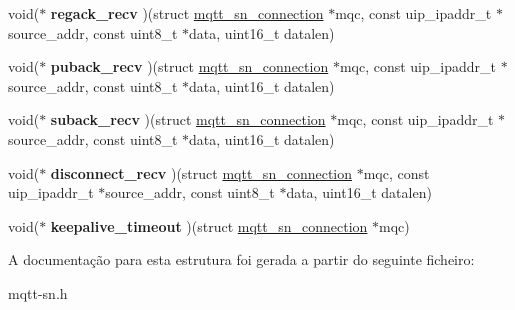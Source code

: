 \begin{DoxyCompactItemize}
\item 
\hypertarget{structmqtt__sn__callbacks_aa709f5480de9cbaa3d8e4e0639dce6d5}{void($\ast$ {\bfseries regack\+\_\+recv} )(struct \hyperlink{structmqtt__sn__connection}{mqtt\+\_\+sn\+\_\+connection} $\ast$mqc, const uip\+\_\+ipaddr\+\_\+t $\ast$source\+\_\+addr, const uint8\+\_\+t $\ast$data, uint16\+\_\+t datalen)}\label{structmqtt__sn__callbacks_aa709f5480de9cbaa3d8e4e0639dce6d5}

\item 
\hypertarget{structmqtt__sn__callbacks_adb3f45b6d6f0d1e9e195cab723b2d273}{void($\ast$ {\bfseries puback\+\_\+recv} )(struct \hyperlink{structmqtt__sn__connection}{mqtt\+\_\+sn\+\_\+connection} $\ast$mqc, const uip\+\_\+ipaddr\+\_\+t $\ast$source\+\_\+addr, const uint8\+\_\+t $\ast$data, uint16\+\_\+t datalen)}\label{structmqtt__sn__callbacks_adb3f45b6d6f0d1e9e195cab723b2d273}

\item 
\hypertarget{structmqtt__sn__callbacks_adf25be026f89dd4116bf758996612d56}{void($\ast$ {\bfseries suback\+\_\+recv} )(struct \hyperlink{structmqtt__sn__connection}{mqtt\+\_\+sn\+\_\+connection} $\ast$mqc, const uip\+\_\+ipaddr\+\_\+t $\ast$source\+\_\+addr, const uint8\+\_\+t $\ast$data, uint16\+\_\+t datalen)}\label{structmqtt__sn__callbacks_adf25be026f89dd4116bf758996612d56}

\item 
\hypertarget{structmqtt__sn__callbacks_a8abfc3253c5081ad7b7b0386f7281073}{void($\ast$ {\bfseries disconnect\+\_\+recv} )(struct \hyperlink{structmqtt__sn__connection}{mqtt\+\_\+sn\+\_\+connection} $\ast$mqc, const uip\+\_\+ipaddr\+\_\+t $\ast$source\+\_\+addr, const uint8\+\_\+t $\ast$data, uint16\+\_\+t datalen)}\label{structmqtt__sn__callbacks_a8abfc3253c5081ad7b7b0386f7281073}

\item 
\hypertarget{structmqtt__sn__callbacks_ae322d28b4c254ad31d3f4aaa227107a2}{void($\ast$ {\bfseries keepalive\+\_\+timeout} )(struct \hyperlink{structmqtt__sn__connection}{mqtt\+\_\+sn\+\_\+connection} $\ast$mqc)}\label{structmqtt__sn__callbacks_ae322d28b4c254ad31d3f4aaa227107a2}

\end{DoxyCompactItemize}


A documentação para esta estrutura foi gerada a partir do seguinte ficheiro\+:\begin{DoxyCompactItemize}
\item 
mqtt-\/sn.\+h\end{DoxyCompactItemize}
